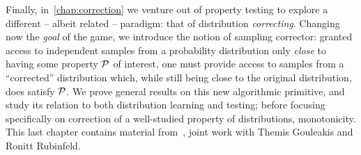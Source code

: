 Finally, in~\cref{chap:correction} we venture out of property testing to explore a different -- albeit related -- paradigm: that of distribution \emph{correcting}. Changing now the \emph{goal} of the game, we introduce the notion of sampling corrector: granted access to independent samples from a probability distribution only \emph{close} to having some property $\mathcal{P}$ of interest, one must provide access to samples from a ``corrected'' distribution which, while still being close to the original distribution, does satisfy $\mathcal{P}$. We prove general results on this new algorithmic primitive, and study its relation to both distribution learning and testing; before focusing specifically on correction of a well-studied property of distributions, monotonicity. This last chapter contains material from~\cite{CGR:16}, joint work with Themis Gouleakis and Ronitt Rubinfeld.
